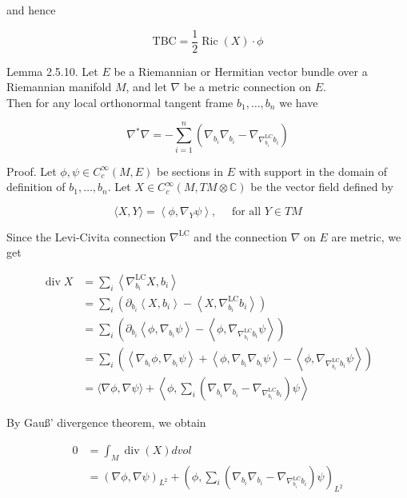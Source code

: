 \documentclass[10pt, letterpaper]{article}
\begin{document}
and hence

$$
\mathrm{TBC}=\frac{1}{2} \operatorname{Ric}(X) \cdot \phi
$$

Lemma 2.5.10. Let $E$ be a Riemannian or Hermitian vector bundle over a Riemannian manifold $M$, and let $\nabla$ be a metric connection on $E$.\\
Then for any local orthonormal tangent frame $b_{1}, \ldots, b_{n}$ we have

$$
\nabla^{*} \nabla=-\sum_{i=1}^{n}\left(\nabla_{b_{i}} \nabla_{b_{i}}-\nabla_{\nabla_{b_{i}}^{\mathrm{LC}} b_{i}}\right)
$$

Proof. Let $\phi, \psi \in C_{c}^{\infty}(M, E)$ be sections in $E$ with support in the domain of definition of $b_{1}, \ldots, b_{n}$. Let $X \in C_{c}^{\infty}(M, T M \otimes \mathbb{C})$ be the vector field defined by

$$
\langle X, Y\rangle=\left\langle\phi, \nabla_{Y} \psi\right\rangle, \quad \text { for all } Y \in T M
$$

Since the Levi-Civita connection $\nabla^{\mathrm{LC}}$ and the connection $\nabla$ on $E$ are metric, we get

$$
\begin{aligned}
\operatorname{div} X & =\sum_{i}\left\langle\nabla_{b_{i}}^{\mathrm{LC}} X, b_{i}\right\rangle \\
& =\sum_{i}\left(\partial_{b_{i}}\left\langle X, b_{i}\right\rangle-\left\langle X, \nabla_{b_{i}}^{\mathrm{LC}} b_{i}\right\rangle\right) \\
& =\sum_{i}\left(\partial_{b_{i}}\left\langle\phi, \nabla_{b_{i}} \psi\right\rangle-\left\langle\phi, \nabla_{\nabla_{b_{i}}^{\mathrm{LC}} b_{i}} \psi\right\rangle\right) \\
& =\sum_{i}\left(\left\langle\nabla_{b_{i}} \phi, \nabla_{b_{i}} \psi\right\rangle+\left\langle\phi, \nabla_{b_{i}} \nabla_{b_{i}} \psi\right\rangle-\left\langle\phi, \nabla_{\nabla_{b_{i}}^{\mathrm{LC}} b_{i}} \psi\right\rangle\right) \\
& =\langle\nabla \phi, \nabla \psi\rangle+\left\langle\phi, \sum_{i}\left(\nabla_{b_{i}} \nabla_{b_{i}}-\nabla_{\nabla_{b_{i}}^{\mathrm{LC}} b_{i}}\right) \psi\right\rangle
\end{aligned}
$$

By Gauß' divergence theorem, we obtain

$$
\begin{aligned}
0 & =\int_{M} \operatorname{div}(X) d v o l \\
& =(\nabla \phi, \nabla \psi)_{L^{2}}+\left(\phi, \sum_{i}\left(\nabla_{b_{i}} \nabla_{b_{i}}-\nabla_{\nabla_{b_{i}}^{\mathrm{LC}} b_{i}}\right) \psi\right)_{L^{2}}
\end{aligned}
$$
\end{document}
